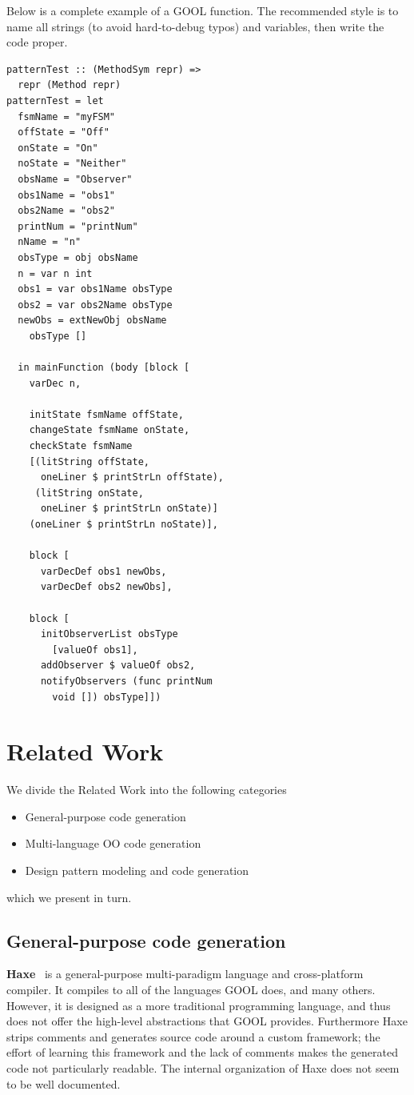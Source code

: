 \documentclass[sigplan,review,anonymous,prologue,dvipsnames]{acmart}
\begin{document}
Below is a complete example of a GOOL function.  The recommended style is
to name all strings (to avoid hard-to-debug typos) and variables, then
write the code proper.
\begin{lstlisting}
patternTest :: (MethodSym repr) => 
  repr (Method repr)
patternTest = let 
  fsmName = "myFSM"
  offState = "Off"
  onState = "On"
  noState = "Neither"
  obsName = "Observer"
  obs1Name = "obs1"
  obs2Name = "obs2"
  printNum = "printNum"
  nName = "n"
  obsType = obj obsName
  n = var n int
  obs1 = var obs1Name obsType
  obs2 = var obs2Name obsType
  newObs = extNewObj obsName 
    obsType []
    
  in mainFunction (body [block [
    varDec n,

    initState fsmName offState, 
    changeState fsmName onState,
    checkState fsmName 
    [(litString offState, 
      oneLiner $ printStrLn offState), 
     (litString onState, 
      oneLiner $ printStrLn onState)] 
    (oneLiner $ printStrLn noState)],

    block [
      varDecDef obs1 newObs, 
      varDecDef obs2 newObs],

    block [
      initObserverList obsType 
        [valueOf obs1], 
      addObserver $ valueOf obs2,
      notifyObservers (func printNum 
        void []) obsType]])
\end{lstlisting}

\section{Related Work} \label{sec:related}

We divide the Related Work into the following categories
\begin{itemize}
\item General-purpose code generation
\item Multi-language OO code generation
\item Design pattern modeling and code generation
\end{itemize}
which we present in turn.

\subsection{General-purpose code generation}

\textbf{Haxe}~\cite{Haxe} is a general-purpose multi-paradigm language and cross-platform
compiler.  It compiles to all of the languages GOOL does, and many
others.  However, it is designed as a more traditional programming language, and
thus does not offer the high-level abstractions that GOOL provides. Furthermore
Haxe strips comments and generates source code around a custom framework; 
the effort of learning this framework and the lack of comments makes the generated
code not particularly readable. The internal organization of Haxe does not seem
to be well documented.
\end{document}
